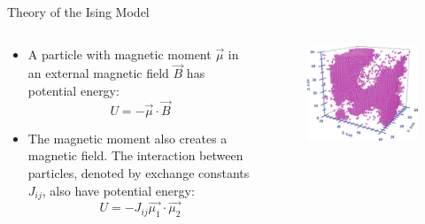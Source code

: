 \documentclass{minesbeamer}
\begin{document}
\begin{frame}{Theory of the Ising Model}
    \begin{columns}
        \begin{column}{0.6\textwidth}
            \begin{itemize}
                \item A particle with magnetic moment $\overrightarrow{\mu}$ in an external magnetic field $\overrightarrow{B}$ has potential energy: $$U = -\overrightarrow{\mu}\cdot \overrightarrow{B}$$
                \item The magnetic moment also creates a magnetic field. The interaction between particles, denoted by exchange constants $J_{ij}$, also have potential energy: $$U = -J_{ij}\overrightarrow{\mu_1}\cdot\overrightarrow{\mu_2}$$
            \end{itemize}
        \end{column}
        \begin{column}{0.4\textwidth}
            \begin{figure}
                \centering
                \includegraphics[height=0.6\textheight]{F5.png}
            \end{figure}
        \end{column}
    \end{columns}
\end{frame}
\end{document}
